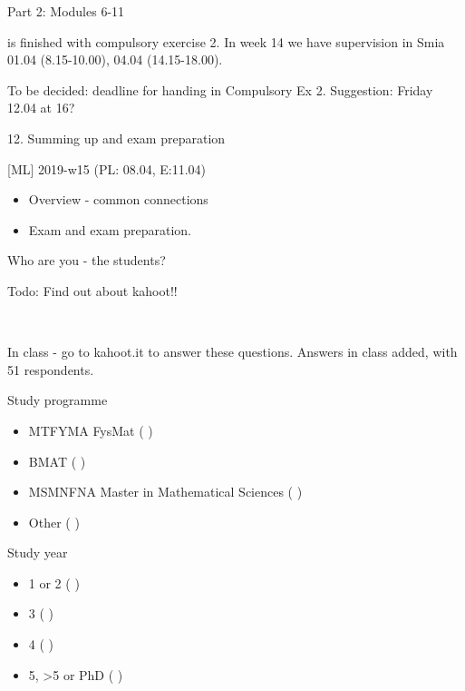 \documentclass[ignorenonframetext,]{beamer}
\providecommand{\tightlist}{%
  \setlength{\itemsep}{0pt}\setlength{\parskip}{0pt}}
\begin{document}
\begin{frame}

\begin{block}{Part 2: Modules 6-11}

is finished with compulsory exercise 2. In week 14 we have supervision
in Smia 01.04 (8.15-10.00), 04.04 (14.15-18.00).

To be decided: deadline for handing in Compulsory Ex 2. Suggestion:
Friday 12.04 at 16?

\end{block}

\begin{block}{12. Summing up and exam preparation}

{[}ML{]} 2019-w15 (PL: 08.04, E:11.04)

\begin{itemize}
\tightlist
\item
  Overview - common connections
\item
  Exam and exam preparation.
\end{itemize}

\end{block}

\end{frame}

\begin{frame}{Who are you - the students?}

Todo: Find out about kahoot!!

~

In class - go to kahoot.it to answer these questions. Answers in class
added, with 51 respondents.

\begin{block}{Study programme}

\begin{itemize}
\tightlist
\item
  MTFYMA FysMat ( )
\item
  BMAT ( )
\item
  MSMNFNA Master in Mathematical Sciences ( )
\item
  Other ( )
\end{itemize}

\end{block}

\begin{block}{Study year}

\begin{itemize}
\tightlist
\item
  1 or 2 ( )
\item
  3 ( )
\item
  4 ( )
\item
  5, \textgreater{}5 or PhD ( )
\end{itemize}

\end{block}

\end{frame}
\end{document}
